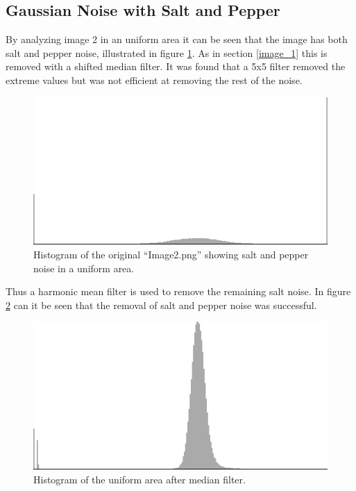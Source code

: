 \subsection{Gaussian Noise with Salt and Pepper}

By analyzing image 2 in an uniform area it can be seen that the image has both salt and pepper noise, illustrated in figure \ref{fig:hist2_uniform}.
As in section \ref{image_1} this is removed with a shifted median filter. 
It was found that a 5x5 filter removed the extreme values but was not efficient at removing the rest of the noise.

\begin{figure}[H]
\centering
\includegraphics[width = \histogramWidth]{graphics/hist2_uniform.png}
\caption{Histogram of the original ``Image2.png'' showing salt and pepper noise in a uniform area.}
\label{fig:hist2_uniform}
\end{figure}

Thus a harmonic mean filter is used to remove the remaining salt noise.
In figure \ref{fig:hist2_median} can it be seen that the removal of salt and pepper noise was successful.

\begin{figure}[H]
\centering
\includegraphics[width = \histogramWidth]{graphics/hist2_after_median.png}
\caption{Histogram of the uniform area after median filter.}
\label{fig:hist2_median}
\end{figure}

